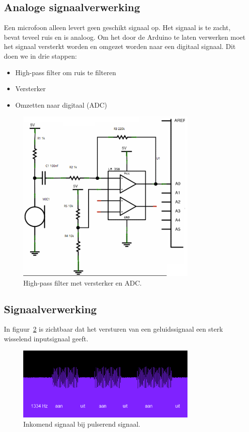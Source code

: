 \documentclass[a4paper,10pt]{article}
\begin{document}
\subsection{Analoge signaalverwerking}
Een microfoon alleen levert geen geschikt signaal op. Het signaal is te zacht, bevat teveel ruis en is analoog. Om het door de Arduino te laten verwerken moet het signaal versterkt worden en omgezet worden naar een digitaal signaal. Dit doen we in drie stappen:


\begin{itemize}
	\item High-pass filter om ruis te filteren
	\item Versterker
	\item Omzetten naar digitaal (ADC)
\end{itemize}

\begin{figure}[ht!]
    \centering
    \includegraphics[width=0.8\textwidth]{high_pass_filter_circuit.png}
    \caption{High-pass filter met versterker en ADC.}
    \label{fig:circuit}
\end{figure}


\subsection{Signaalverwerking}
In figuur~\ref{fig:on_off} is zichtbaar dat het versturen van een geluidssignaal een sterk wisselend inputsignaal geeft.
\begin{figure}[ht!]
    \centering
    \includegraphics[width=0.8\textwidth]{resonance_on_off_commit_ff82f.png}
    \caption{Inkomend signaal bij pulserend signaal.}
    \label{fig:on_off}
\end{figure}
\end{document}
